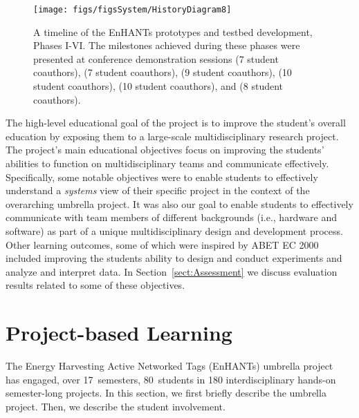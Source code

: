 \documentclass[journal,twopages]{IEEEtran}
\begin{document}
\begin{figure*}[t]
\centering
\centering
\texttt{[image: figs/figsSystem/HistoryDiagram8]}
\caption{A timeline of the EnHANTs prototypes and testbed development,
  Phases I-VI. The milestones achieved during these phases were presented at conference
  demonstration sessions \cite{SeconDemoEnHANTs2010} (7 student coauthors),
  \cite{MobiComDemo} (7 student coauthors), \cite{MobiSys2011Demo} (9 student coauthors),
  \cite{SenSys2011Demo} (10 student coauthors),
  \cite{IDTechDemo2012} (10 student coauthors), and \cite{Margolies2013Demo} (8 student coauthors).
  \label{fig:PrototypeDevelopmentStages}\label{fig:PhasesPhoto}}
\end{figure*}

The high-level educational goal of the project is to improve the student's overall education by exposing them to a large-scale multidisciplinary research project. The project's main educational objectives focus on improving the students' abilities to function on multidisciplinary teams and communicate effectively. Specifically, some notable objectives were to enable students to effectively understand a \emph{systems} view of their specific project in the context of the overarching umbrella project. It was also our goal to enable students to effectively communicate with team members of different backgrounds (i.e., hardware and software) as part of a unique multidisciplinary design and development process.
Other learning outcomes, some of which were inspired by ABET EC 2000~\cite{ABET2000} included improving the students ability to design and conduct experiments and analyze and interpret data. In Section~\ref{sect:Assessment} we discuss evaluation results related to some of these objectives. 







 


\section{Project-based Learning} \label{sect:Umbrella}



The Energy Harvesting Active Networked Tags (EnHANTs) umbrella proj\-ect~\cite{EnHANTsProject} has engaged, over 17~semesters, 80~students in 180 interdisciplinary hands-on semester-long projects. In this section, we first briefly describe the umbrella project.
Then, we describe the student involvement.
\end{document}
